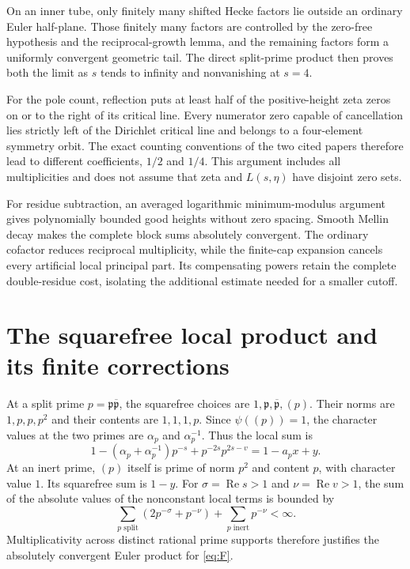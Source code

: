 \documentclass[11pt]{article}
\numberwithin{equation}{section}
\newcommand{\Rea}{\operatorname{Re}}
\begin{document}
On an inner tube, only finitely many shifted Hecke factors lie
outside an ordinary Euler half-plane. Those finitely many factors
are controlled by the zero-free hypothesis and the reciprocal-growth
lemma, and the remaining factors form a uniformly convergent
geometric tail. The direct split-prime product then proves both
the limit as $s$ tends to infinity and nonvanishing at $s=4$.

For the pole count, reflection puts at least half of the
positive-height zeta zeros on or to the right of its critical line.
Every numerator zero capable of cancellation lies strictly left
of the Dirichlet critical line and belongs to a four-element
symmetry orbit. The exact counting conventions of the two cited
papers therefore lead to different coefficients, $1/2$ and $1/4$.
This argument includes all multiplicities and does not assume
that zeta and $L(s,\eta)$ have disjoint zero sets.

For residue subtraction, an averaged logarithmic minimum-modulus argument gives polynomially bounded good heights without zero spacing. Smooth Mellin decay makes the complete block sums absolutely convergent. The ordinary cofactor reduces reciprocal multiplicity, while the finite-cap expansion cancels every artificial local principal part. Its compensating powers retain the complete double-residue cost, isolating the additional estimate needed for a smaller cutoff.

\section{The squarefree local product and its finite corrections}

At a split prime $p=\mathfrak p\overline{\mathfrak p}$, the
squarefree choices are $1,\mathfrak p,\overline{\mathfrak p},(p)$.
Their norms are $1,p,p,p^2$ and their contents are $1,1,1,p$.
Since $\psi((p))=1$, the character values at the two primes are
$\alpha_p$ and $\alpha_p^{-1}$. Thus the local sum is
\begin{equation}\label{eq:splitF}
 1-(\alpha_p+\alpha_p^{-1})p^{-s}
       +p^{-2s}p^{2s-v}=1-a_px+y.
\end{equation}
At an inert prime, $(p)$ itself is prime of norm $p^2$ and content
$p$, with character value $1$. Its squarefree sum is $1-y$.
For $\sigma=\Rea s>1$ and $\nu=\Rea v>1$, the sum of the absolute
values of the nonconstant local terms is bounded by
\begin{equation}
 \sum_{p\text{ split}}(2p^{-\sigma}+p^{-\nu})
       +\sum_{p\text{ inert}}p^{-\nu}<\infty.
\end{equation}
Multiplicativity across distinct rational prime supports therefore
justifies the absolutely convergent Euler product for \eqref{eq:F}.
\end{document}
